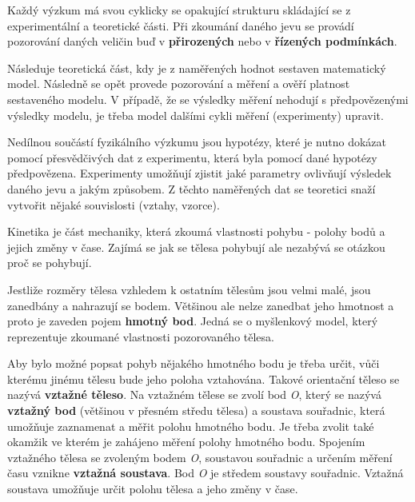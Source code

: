 Každý výzkum má svou cyklicky se opakující strukturu skládající se z experimentální a teoretické části. Při zkoumání daného jevu se provádí pozorování daných veličin buď v {\bf přirozených} nebo v {\bf řízených podmínkách}. 

Následuje teoretická část, kdy je z naměřených hodnot sestaven matematický model. Následně se opět provede pozorování a měření a ověří platnost sestaveného modelu. V případě, že se výsledky měření nehodují s předpovězenými výsledky modelu, je třeba model dalšími cykli měření (experimenty) upravit.

Nedílnou součástí fyzikálního výzkumu jsou hypotézy, které je nutno dokázat pomocí přesvědčivých dat z experimentu, která byla pomocí dané hypotézy předpovězena. Experimenty umožňují zjistit jaké parametry ovlivňují výsledek daného jevu a jakým způsobem. Z těchto naměřených dat se teoretici snaží vytvořit nějaké souvislosti (vztahy, vzorce).




Kinetika je část mechaniky, která zkoumá vlastnosti pohybu - polohy bodů a jejich změny v čase. Zajímá se jak se tělesa pohybují ale nezabývá se otázkou proč se pohybují. 


Jestliže rozměry tělesa vzhledem k ostatním tělesům jsou velmi malé, jsou zanedbány a nahrazují se bodem. Většinou ale nelze zanedbat jeho hmotnost a proto je zaveden pojem {\bf hmotný bod}. Jedná se o myšlenkový model, který reprezentuje zkoumané vlastnosti pozorovaného tělesa. 

Aby bylo možné popsat pohyb nějakého hmotného bodu je třeba určit, vůči kterému jinému tělesu bude jeho poloha vztahována. Takové orientační těleso se nazývá {\bf vztažné těleso}. Na vztažném tělese se zvolí bod {\it O}, který se nazývá {\bf vztažný bod} (většinou v přesném středu tělesa) a soustava souřadnic, která umožňuje zaznamenat a měřit polohu hmotného bodu. Je třeba zvolit také okamžik ve kterém je zahájeno měření polohy hmotného bodu. Spojením vztažného tělesa se zvoleným bodem {\it O}, soustavou souřadnic a určením měření času vznikne {\bf vztažná soustava}. Bod {\it O} je středem soustavy souřadnic. Vztažná soustava umožňuje určit polohu tělesa a jeho změny v čase.

\vskip 4mm
\centerline{}
\vskip 4mm


